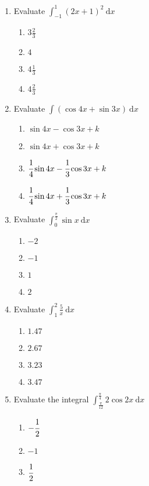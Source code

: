 \begin{multicols}{2}
\begin{enumerate}[label={\arabic*.}]
    \item Evaluate \(\displaystyle \int_{-1}^{1} {\left(2x + 1\right)}^{2}\ \mathrm{d}x\)
      \begin{enumerate}[label={\Alph*.}]
        \item \(3\frac{2}{3}\)
        \item \(4\)
        \item \(4\frac{1}{3}\)
        \item \(4\frac{2}{3}\)
      \end{enumerate}
    \item Evaluate \(\displaystyle \int \left(\cos{4x} + \sin{3x}\right)\ \mathrm{d}x\)
      \begin{enumerate}[label={\Alph*.}]
        \item \(\sin{4x} - \cos{3x} + k\)
        \item \(\sin{4x} + \cos{3x} + k\)
        \item \(\cfrac{1}{4}\sin{4x} - \cfrac{1}{3}\cos{3x} + k\)
        \item \(\cfrac{1}{4}\sin{4x} + \cfrac{1}{3}\cos{3x} + k\)
      \end{enumerate}
    \item Evaluate \(\displaystyle \int_{0}^{\frac{\pi}{2}} \sin{x}\ \mathrm{d}x\)
      \begin{enumerate}[label={\Alph*.}]
        \item \(-2\)
        \item \(-1\)
        \item \(1\)
        \item \(2\)
      \end{enumerate}
    \item Evaluate \(\displaystyle \int_{1}^{2}\frac{5}{x}\ \mathrm{d}x\)
      \begin{enumerate}[label={\Alph*.}]
        \item \(1.47\)
        \item \(2.67\)
        \item \(3.23\)
        \item \(3.47\)
      \end{enumerate}
    \item Evaluate the integral \(\displaystyle \int_{\frac{\pi}{12}}^{\frac{\pi}{4}} 2\cos{2x}\ \mathrm{d}x\)
      \begin{enumerate}[label={\Alph*.}]
        \item \(-{\cfrac{1}{2}}\)
        \item \(-1\)
        \item \(\cfrac{1}{2}\)

\end{enumerate}
\end{enumerate}
\end{multicols}
